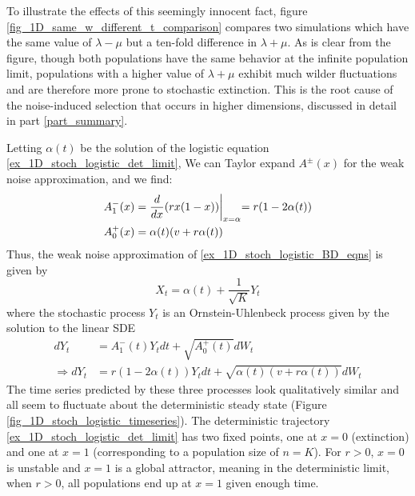 To illustrate the effects of this seemingly innocent fact, figure \ref{fig_1D_same_w_different_t_comparison} compares two simulations which have the same value of $\lambda - \mu$ but a ten-fold difference in $\lambda+\mu$. As is clear from the figure, though both populations have the same behavior at the infinite population limit, populations with a higher value of $\lambda+\mu$ exhibit much wilder fluctuations and are therefore more prone to stochastic extinction. This is the root cause of the noise-induced selection that occurs in higher dimensions, discussed in detail in part \ref{part_summary}.

Letting $\alpha(t)$ be the solution of the logistic equation \eqref{ex_1D_stoch_logistic_det_limit}, We can Taylor expand $A^{\pm}(x)$ for the weak noise approximation, and we find:
\begin{align*}
A^-_1(x) &= \frac{d}{dx}(rx(1-x))\biggl{|}_{x=\alpha} = r(1 - 2\alpha(t))\\
A^+_0(x) &= \alpha(t)(v+r\alpha(t))
\end{align*}
Thus, the weak noise approximation of \ref{ex_1D_stoch_logistic_BD_eqns} is given by
\begin{equation}
    X_t = \alpha(t) + \frac{1}{\sqrt{K}}Y_t
\end{equation}
where the stochastic process $Y_t$ is an Ornstein-Uhlenbeck process given by the solution to the linear SDE
\begin{align}
    dY_t &= A^-_1(t)Y_tdt + \sqrt{A^+_0(t)}dW_t\nonumber\\
    \Rightarrow dY_t &= r(1 - 2\alpha(t))Y_tdt + \sqrt{\alpha(t)(v+r\alpha(t))}dW_t\label{ex_1D_stoch_logistic_WNA}
\end{align}
The time series predicted by these three processes look qualitatively similar and all seem to fluctuate about the deterministic steady state (Figure \ref{fig_1D_stoch_logistic_timeseries}).
The deterministic trajectory \eqref{ex_1D_stoch_logistic_det_limit} has two fixed points, one at $x=0$ (extinction) and one at $x=1$ (corresponding to a population size of $n=K$). For $r > 0$, $x=0$ is unstable and $x=1$ is a global attractor, meaning in the deterministic limit, when $r > 0$, all populations end up at $x=1$ given enough time.

